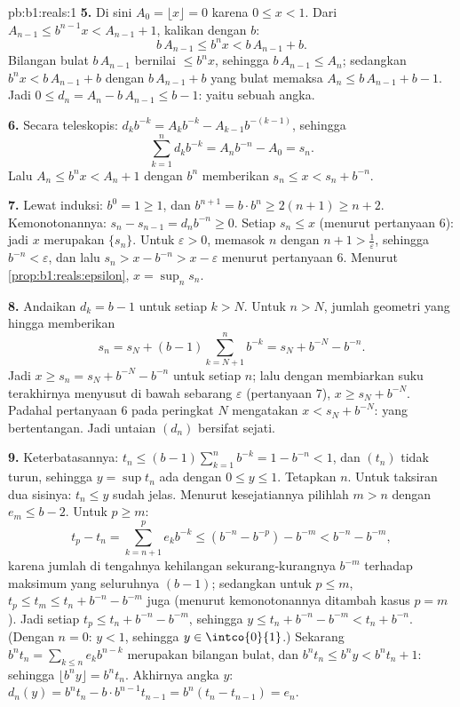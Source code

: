 \begin{solution}{pb:b1:reals:1}
\textbf{5.} Di sini $A_0 = \lfloor x \rfloor = 0$ karena $0 \leq x < 1$.
Dari $A_{n-1} \leq b^{n-1} x < A_{n-1} + 1$, kalikan dengan $b$:
\[
b\,A_{n-1} \leq b^n x < b\,A_{n-1} + b .
\]
Bilangan bulat $b\,A_{n-1}$ bernilai $\leq b^n x$, sehingga $b\,A_{n-1} \leq
A_n$; sedangkan $b^n x < b\,A_{n-1} + b$ dengan $b\,A_{n-1} + b$ yang bulat
memaksa $A_n \leq b\,A_{n-1} + b - 1$. Jadi $0 \leq d_n =
A_n - b\,A_{n-1} \leq b - 1$: yaitu sebuah angka.

\textbf{6.} Secara teleskopis: $d_k b^{-k} = A_k b^{-k} - A_{k-1}
b^{-(k-1)}$, sehingga
\[
\sum_{k=1}^n d_k b^{-k} = A_n b^{-n} - A_0 = s_n .
\]
Lalu  $A_n \leq b^n x < A_n + 1$ dengan $b^n$ memberikan $s_n \leq x <
s_n + b^{-n}$.

\textbf{7.} Lewat induksi: $b^0 = 1 \geq 1$, dan $b^{n+1} = b \cdot
b^n \geq 2(n + 1) \geq n + 2$. Kemonotonannya: $s_n - s_{n-1} = d_n
b^{-n} \geq 0$. Setiap $s_n \leq x$ (menurut pertanyaan 6): jadi $x$ merupakan  $\{s_n\}$. Untuk $\varepsilon > 0$, 
memasok $n$ dengan $n + 1 > \frac1\varepsilon$, sehingga
$b^{-n} < \varepsilon$, dan lalu $s_n > x - b^{-n} > x -
\varepsilon$ menurut pertanyaan 6. Menurut \cref{prop:b1:reals:epsilon}, $x =
\sup_n s_n$.

\textbf{8.} Andaikan $d_k = b - 1$ untuk setiap $k > N$. Untuk $n > N$,
jumlah geometri yang hingga memberikan
\[
s_n = s_N + (b - 1)\sum_{k=N+1}^{n} b^{-k}
= s_N + b^{-N} - b^{-n} .
\]
Jadi $x \geq s_n = s_N + b^{-N} - b^{-n}$ untuk setiap $n$; lalu dengan membiarkan
suku terakhirnya menyusut di bawah sebarang $\varepsilon$ (pertanyaan 7), $x
\geq s_N + b^{-N}$. Padahal pertanyaan 6 pada peringkat $N$ mengatakan $x < s_N +
b^{-N}$: yang bertentangan. Jadi untaian $(d_n)$ bersifat sejati.

\textbf{9.} Keterbatasannya: $t_n \leq (b-1)\sum_{k=1}^n b^{-k} = 1 -
b^{-n} < 1$, dan $(t_n)$ tidak turun, sehingga $y = \sup t_n$
ada dengan $0 \leq y \leq 1$. Tetapkan $n$. Untuk taksiran
dua sisinya: $t_n \leq y$ sudah jelas. Menurut kesejatiannya pilihlah $m > n$ dengan
$e_m \leq b - 2$. Untuk $p \geq m$:
\[
t_p - t_n = \sum_{k=n+1}^{p} e_k b^{-k}
\leq (b^{-n} - b^{-p}) - b^{-m} < b^{-n} - b^{-m},
\]
karena jumlah di tengahnya kehilangan sekurang-kurangnya $b^{-m}$ terhadap maksimum
yang seluruhnya $(b-1)$; sedangkan untuk $p \leq m$, $t_p \leq t_m \leq t_n + b^{-n} -
b^{-m}$ juga (menurut kemonotonannya ditambah kasus $p = m$). Jadi setiap
$t_p \leq t_n + b^{-n} - b^{-m}$, sehingga $y \leq t_n + b^{-n} -
b^{-m} < t_n + b^{-n}$. (Dengan $n = 0$: $y < 1$, sehingga $y \in
\intco{0}{1}$.) Sekarang $b^n t_n = \sum_{k \leq n} e_k b^{n-k}$ merupakan
bilangan bulat, dan $b^n t_n \leq b^n y < b^n t_n + 1$: sehingga $\lfloor b^n
y \rfloor = b^n t_n$. Akhirnya angka $y$: $d_n(y) = b^n
t_n - b \cdot b^{n-1} t_{n-1} = b^n(t_n - t_{n-1}) = e_n$.


\end{solution}
